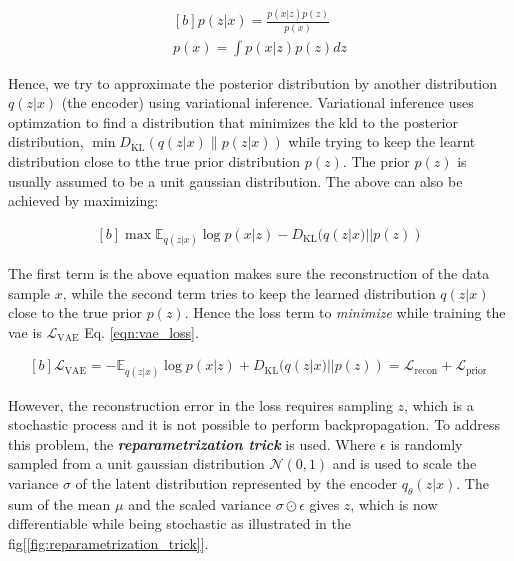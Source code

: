 \begin{equation}\label{eqn:pofx}
    \begin{gathered}[b]
        p(z | x)=\frac{p(x | z) p(z)}{p(x)} \\
        p(x)=\int p(x | z) p(z) dz
    \end{gathered}
\end{equation}

Hence, we try to approximate the posterior distribution by another distribution $q(z|x)$ (the encoder) using variational inference. Variational inference uses optimzation to find a distribution that minimizes the \ac{kld} to the posterior distribution, $\min D_{\mathrm{KL}}(q(z| x) \| p(z| x))$ while trying to keep the learnt distribution close to tthe true prior distribution $p(z)$\cite{variational_inference}. The prior $p(z)$ is usually assumed to be a unit gaussian distribution. The above can also be achieved by maximizing:

\begin{equation} \label{eqn:minKLd}
    \begin{gathered}[b]
        \max \mathbb{E}_{q(z | x)} \log p(x | z) - D_{\mathrm{KL}}(q(z | x) || p(z))
    \end{gathered}
\end{equation}

The first term is the above equation makes sure the reconstruction of the data sample $x$, while the second term tries to keep the learned distribution $q(z|x)$ close to the true prior $p(z)$. Hence the loss term to \textit{minimize} while training the \ac{vae} is $\mathcal{L}_{\mathrm{VAE}}$ Eq. \ref{eqn:vae_loss}.

\begin{equation} \label{eqn:vae_loss}
    \begin{gathered}[b]
        \mathcal{L}_{\mathrm{VAE}}=-\mathbb{E}_{q(z | x)} \log p(x | z) + D_{\mathrm{KL}}(q(z | x) || p(z)) =\mathcal{L}_{\text {recon}} +\mathcal{L}_{\text {prior }}
    \end{gathered}
\end{equation}

However, the reconstruction error in the loss requires sampling $z$, which is a stochastic process and it is not possible to perform backpropagation. To address this problem, the \textbf{\textit{reparametrization trick}} is used. Where $\epsilon$ is randomly sampled from a unit gaussian distribution $\mathcal{N}(0,1)$ and is used to scale the variance $\sigma$ of the latent distribution represented by the encoder $q_{\theta}(z|x)$. The sum of the mean $\mu$ and the scaled variance $\sigma \odot \epsilon$ gives $z$, which is now differentiable while being stochastic as illustrated in the fig[\ref{fig:reparametrization_trick}].

